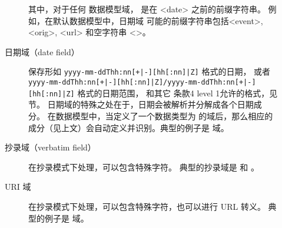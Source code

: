 \begin{description}
\begin{description}
其中，对于任何  数据模型域， 是在 <date> 之前的前缀字符串。
例如，在默认数据模型中，日期域  可能的前缀字符串包括<event>, <orig>, <url> 和空字符串 <>。


\item[日期域（date field）] 保存形如 \texttt{yyyy-mm-ddThh:nn[+|-][hh[:nn]|Z]} 格式的日期，
或者 \texttt{yyyy-mm-ddThh:nn[+|-][hh[:nn]|Z]/yyyy-mm-ddThh:nn[+|-][hh[:nn]|Z]} 格式的日期范围，
和其它 条款4 level 1允许的格式，见  节。
日期域的特殊之处在于，日期会被解析并分解成各个日期成分。
在数据模型中，当定义了一个数据类型为  的域后，那么相应的  成分（见上文）会自动定义并识别。典型的例子是  域。


\item[抄录域（verbatim field）] 在抄录模式下处理，可以包含特殊字符。
典型的抄录域是  和 。

\item[URI 域] 在抄录模式下处理，可以包含特殊字符，也可以进行 URL 转义。
典型的例子是  域。



\end{description}
\end{description}
